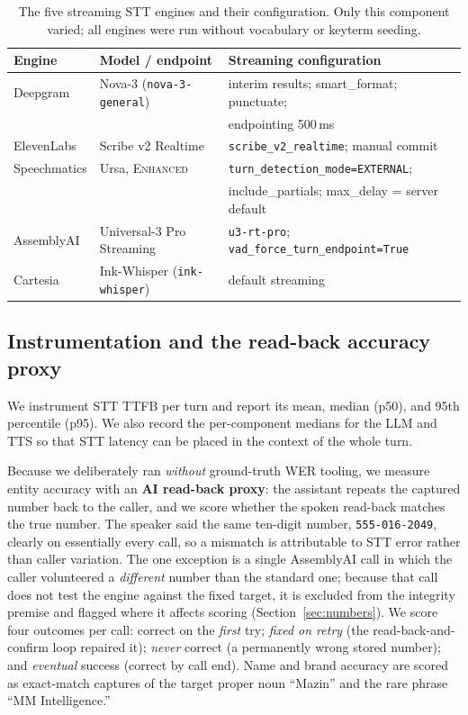 \documentclass[11pt]{article}
\begin{document}
\begin{table}[ht]
\centering
\small
\begin{tabular}{@{}lll@{}}
\toprule
\textbf{Engine} & \textbf{Model / endpoint} & \textbf{Streaming configuration} \\
\midrule
Deepgram & Nova-3 (\texttt{nova-3-general}) & interim results; smart\_format; punctuate; \\
             & & endpointing 500\,ms \\
ElevenLabs & Scribe v2 Realtime & \texttt{scribe\_v2\_realtime}; manual commit \\
Speechmatics & Ursa, \textsc{Enhanced} & \texttt{turn\_detection\_mode=EXTERNAL}; \\
             & & include\_partials; max\_delay = server default \\
AssemblyAI & Universal-3 Pro Streaming & \texttt{u3-rt-pro}; \texttt{vad\_force\_turn\_endpoint=True} \\
Cartesia & Ink-Whisper (\texttt{ink-whisper}) & default streaming \\
\bottomrule
\end{tabular}
\caption{The five streaming STT engines and their configuration. Only this
component varied; all engines were run without vocabulary or keyterm seeding.}
\label{tab:engines}
\end{table}

\subsection{Instrumentation and the read-back accuracy proxy}
We instrument STT TTFB per turn and report its mean, median (p50), and 95th
percentile (p95). We also record the per-component medians for the LLM and TTS
so that STT latency can be placed in the context of the whole turn.

Because we deliberately ran \emph{without} ground-truth WER tooling, we measure
entity accuracy with an \textbf{AI read-back proxy}: the assistant repeats the
captured number back to the caller, and we score whether the spoken read-back
matches the true number. The speaker said the same ten-digit number,
\texttt{555-016-2049}, clearly on essentially every call, so a mismatch is
attributable to STT error rather than caller variation. The one exception is a
single AssemblyAI call in which the caller volunteered a \emph{different} number
than the standard one; because that call does not test the engine against the
fixed target, it is excluded from the integrity premise and flagged where it
affects scoring (Section~\ref{sec:numbers}). We score four outcomes per call:
correct on the \emph{first} try; \emph{fixed on retry} (the read-back-and-confirm
loop repaired it); \emph{never} correct (a permanently wrong stored number); and
\emph{eventual} success (correct by call end). Name and brand accuracy are
scored as exact-match captures of the target proper noun ``Mazin'' and the rare
phrase ``MM Intelligence.''
\end{document}
